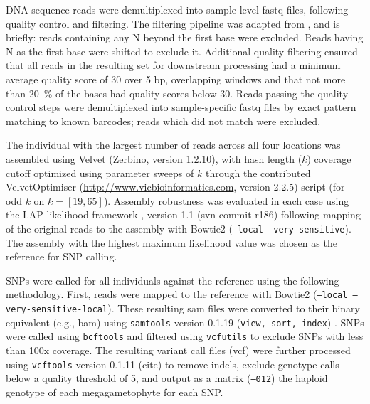 \documentclass[smallextended]{svjour3}
\begin{document}
DNA sequence reads were demultiplexed into sample-level fastq files, following quality control 
and filtering.  The filtering pipeline was adapted from \citep{Friedline:2012fm}, and is briefly: reads 
containing any N beyond the first base were excluded. Reads having N as the first base were shifted 
to exclude it.  Additional quality filtering ensured that all reads in the resulting set for downstream 
processing had a minimum average quality score of 30 over 5 bp, overlapping windows 
and that not more than \SI{20}{\percent} of the bases had quality scores below 30. Reads passing the 
quality control steps were demultiplexed into sample-specific fastq files by exact pattern matching to 
known barcodes; reads which did not match were excluded.

The individual with the largest number of reads across all four locations was assembled using 
Velvet (Zerbino, version 1.2.10), with hash length ($k$) coverage cutoff optimized using parameter sweeps of $k$ 
through the contributed VelvetOptimiser (\url{http://www.vicbioinformatics.com}, version 2.2.5) 
script (for odd $k$ on $k=[19,65]$).  Assembly robustness was evaluated in each case using the LAP likelihood 
framework \citep{Ghodsi:2013bc}, version 1.1 (svn commit r186) following mapping of the original reads to the 
assembly with Bowtie2 \citep{Langmead:2012jh} (\texttt{--local --very-sensitive}).  The assembly with the highest 
maximum likelihood value was chosen as the reference for SNP calling.

SNPs were called for all individuals against the reference using the following methodology.  First, 
reads were mapped to the reference with Bowtie2 (\texttt{--local --very-sensitive-local}).  These resulting 
sam files were converted to their binary equivalent (e.g., bam) using \texttt{samtools} version 0.1.19 
(\texttt{view, sort, index}) \citep{Li:2009ka}.  SNPs were called using \texttt{bcftools} and filtered using 
\texttt{vcfutils} to exclude SNPs with less than 100x coverage. The resulting variant call files (vcf) 
were further processed using \texttt{vcftools} version 0.1.11 (cite) to remove indels, exclude genotype 
calls below a quality threshold of 5, and output as a matrix (\texttt{--012}) the haploid genotype of each megagametophyte for each SNP.  
\end{document}
